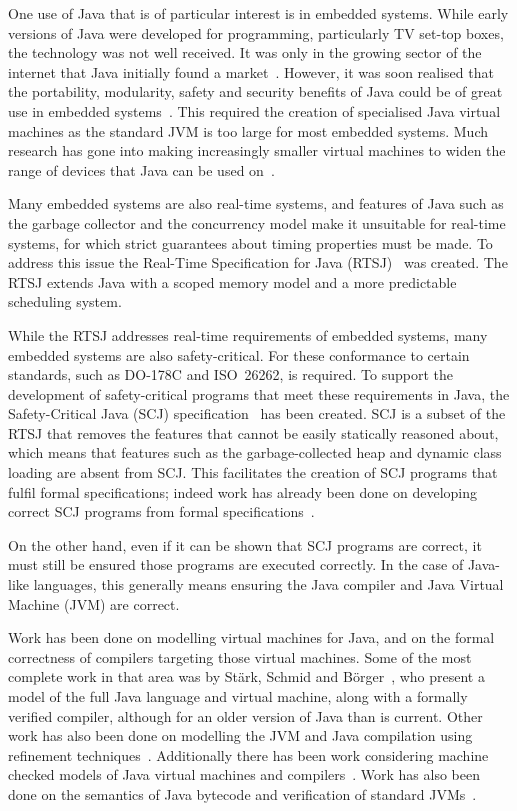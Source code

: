\documentclass[a4paper,10pt]{report}
\begin{document}
One use of Java that is of particular interest is in embedded systems.  While
early versions of Java were developed for programming, particularly TV set-top
boxes, the technology was not well received. It was only in the growing sector
of the internet that Java initially found a market~\cite{horstmann2002}.
However, it was soon realised that the portability, modularity, safety and
security benefits of Java could be of great use in embedded
systems~\cite{mulchandani1998}.  This required the creation of specialised Java
virtual machines as the standard JVM is too large for most embedded systems.
Much research has gone into making increasingly smaller virtual machines to
widen the range of devices that Java can be used on~\cite{caska2011,thomm2010}.

Many embedded systems are also real-time systems, and features of Java such as
the garbage collector and the concurrency model make it unsuitable for real-time
systems, for which strict guarantees about timing properties must be made.  To
address this issue the Real-Time Specification for Java
(RTSJ)~\cite{gosling2000} was created.  The RTSJ extends Java with a scoped
memory model and a more predictable scheduling system.

While the RTSJ addresses real-time requirements of embedded systems, many
embedded systems are also safety-critical.  For these conformance to certain
standards, such as \mbox{DO-178C} and ISO~26262, is required.  To support the
development of safety-critical programs that meet these requirements in Java,
the Safety-Critical Java (SCJ) specification~\cite{locke2013} has been created.
SCJ is a subset of the RTSJ that removes the features that cannot be easily
statically reasoned about, which means that features such as the
garbage-collected heap and dynamic class loading are absent from SCJ.  This
facilitates the creation of SCJ programs that fulfil formal specifications;
indeed work has already been done on developing correct SCJ programs from formal
specifications~\cite{cavalcanti2011, cavalcanti2013}.

On the other hand, even if it can be shown that SCJ programs are correct, it
must still be ensured those programs are executed correctly.  In the case of
Java-like languages, this generally means ensuring the Java compiler and Java
Virtual Machine (JVM) are correct.

Work has been done on modelling virtual machines for Java, and on the formal
correctness of compilers targeting those virtual machines.  Some of the most
complete work in that area was by St\"{a}rk, Schmid and
B\"{o}rger~\cite{stark2001}, who present a model of the full Java language and
virtual machine, along with a formally verified compiler, although for an older
version of Java than is current.  Other work has also been done on modelling the
JVM and Java compilation using refinement
techniques~\cite{duran2010}. Additionally there has been work considering
machine checked models of Java virtual machines and
compilers~\cite{lochbihler2012, nipkow2000, strecker2002}. Work has also been
done on the semantics of Java bytecode and verification of standard
JVMs~\cite{bertelsen2000, jones1998}.
\end{document}
